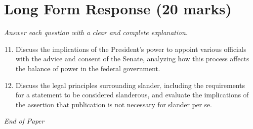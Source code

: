 \documentclass[12pt]{article}
\begin{document}
\section*{Long Form Response (20 marks)}
\textit{Answer each question with a clear and complete explanation.}
\begin{enumerate}[label=\arabic*.]
\setcounter{enumi}{10}
\item Discuss the implications of the President's power to appoint various officials with the advice and consent of the Senate, analyzing how this process affects the balance of power in the federal government.
\item Discuss the legal principles surrounding slander, including the requirements for a statement to be considered slanderous, and evaluate the implications of the assertion that publication is not necessary for slander per se.
\end{enumerate}

\vfill
\noindent\textit{End of Paper}
\end{document}

